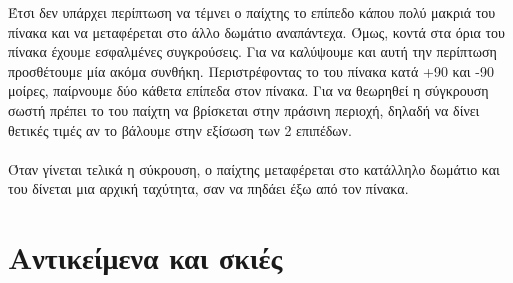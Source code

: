 \documentclass[11pt]{scrartcl} %
\begin{document}
Έτσι δεν υπάρχει περίπτωση να τέμνει ο παίχτης το επίπεδο κάπου πολύ μακριά του πίνακα και να μεταφέρεται στο άλλο δωμάτιο αναπάντεχα.
Όμως, κοντά στα όρια του πίνακα έχουμε εσφαλμένες συγκρούσεις. Για να καλύψουμε και αυτή την περίπτωση προσθέτουμε μία ακόμα συνθήκη.
Περιστρέφοντας το  του πίνακα κατά +90 και -90 μοίρες, παίρνουμε δύο κάθετα επίπεδα στον πίνακα. Για να θεωρηθεί η σύγκρουση
σωστή πρέπει το  του παίχτη να βρίσκεται στην πράσινη περιοχή, δηλαδή να δίνει θετικές τιμές αν το βάλουμε στην εξίσωση
των 2 επιπέδων.
\\\\
Όταν γίνεται τελικά η σύκρουση, ο παίχτης μεταφέρεται στο κατάλληλο δωμάτιο και του δίνεται μια αρχική ταχύτητα,
σαν να πηδάει έξω από τον πίνακα.
\clearpage

\section{Αντικείμενα και σκιές}
\end{document}
